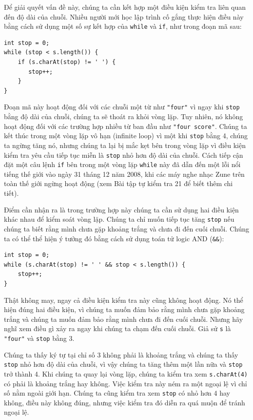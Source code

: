 Để giải quyết vấn đề này, chúng ta cần kết hợp một điều kiện kiểm tra liên quan đến độ dài của chuỗi. Nhiều người mới học lập trình cố gắng thực hiện điều này bằng cách sử dụng một số sự kết hợp của \texttt{while} và \texttt{if}, như trong đoạn mã sau:

\begin{verbatim}
int stop = 0;
while (stop < s.length()) {
    if (s.charAt(stop) != ' ') {
       stop++;
    }
}
\end{verbatim}

Đoạn mã này hoạt động đối với các chuỗi một từ như \texttt{"four"} vì ngay khi \texttt{stop} bằng độ dài của chuỗi, chúng ta sẽ thoát ra khỏi vòng lặp. Tuy nhiên, nó không hoạt động đối với các trường hợp nhiều từ ban đầu như \texttt{"four score"}. Chúng ta kết thúc trong một vòng lặp vô hạn (infinite loop) vì một khi \texttt{stop} bằng 4, chúng ta ngừng tăng nó, nhưng chúng ta lại bị mắc kẹt bên trong vòng lặp vì điều kiện kiểm tra yêu cầu tiếp tục miễn là \texttt{stop} nhỏ hơn độ dài của chuỗi. Cách tiếp cận đặt một câu lệnh \texttt{if} bên trong một vòng lặp \texttt{while} này đã dẫn đến một lỗi nổi tiếng thế giới vào ngày 31 tháng 12 năm 2008, khi các máy nghe nhạc Zune trên toàn thế giới ngừng hoạt động (xem Bài tập tự kiểm tra 21 để biết thêm chi tiết).

Điểm cần nhận ra là trong trường hợp này chúng ta cần sử dụng hai điều kiện khác nhau để kiểm soát vòng lặp. Chúng ta chỉ muốn tiếp tục tăng \texttt{stop} nếu chúng ta biết rằng mình chưa gặp khoảng trắng và chưa đi đến cuối chuỗi. Chúng ta có thể thể hiện ý tưởng đó bằng cách sử dụng toán tử logic AND (\texttt{\&\&}):

\begin{verbatim}
int stop = 0;
while (s.charAt(stop) != ' ' && stop < s.length()) {
    stop++;
}
\end{verbatim}

Thật không may, ngay cả điều kiện kiểm tra này cũng không hoạt động. Nó thể hiện đúng hai điều kiện, vì chúng ta muốn đảm bảo rằng mình chưa gặp khoảng trắng và chúng ta muốn đảm bảo rằng mình chưa đi đến cuối chuỗi. Nhưng hãy nghĩ xem điều gì xảy ra ngay khi chúng ta chạm đến cuối chuỗi. Giả sử \texttt{s} là \texttt{"four"} và \texttt{stop} bằng 3.

Chúng ta thấy ký tự tại chỉ số 3 không phải là khoảng trắng và chúng ta thấy \texttt{stop} nhỏ hơn độ dài của chuỗi, vì vậy chúng ta tăng thêm một lần nữa và \texttt{stop} trở thành 4. Khi chúng ta quay lại vòng lặp, chúng ta kiểm tra xem \texttt{s.charAt(4)} có phải là khoảng trắng hay không. Việc kiểm tra này ném ra một ngoại lệ vì chỉ số nằm ngoài giới hạn. Chúng ta cũng kiểm tra xem \texttt{stop} có nhỏ hơn 4 hay không, điều này không đúng, nhưng việc kiểm tra đó diễn ra quá muộn để tránh ngoại lệ.

